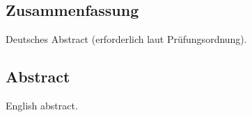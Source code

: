 \subsection*{Zusammenfassung}

Deutsches Abstract (erforderlich laut Prüfungsordnung).


\subsection*{Abstract}

English abstract.
